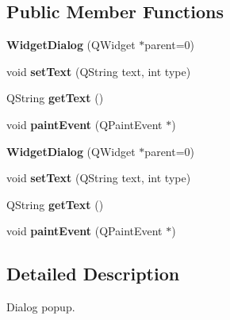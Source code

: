 \subsection*{Public Member Functions}
\begin{DoxyCompactItemize}
\item 
\hypertarget{class_widget_dialog_aa282c5193c1318f92bd21fe77a3f66bb}{}{\bfseries Widget\+Dialog} (Q\+Widget $\ast$parent=0)\label{class_widget_dialog_aa282c5193c1318f92bd21fe77a3f66bb}

\item 
\hypertarget{class_widget_dialog_ad4ee3d228612e11780f73839db9150a9}{}void {\bfseries set\+Text} (Q\+String text, int type)\label{class_widget_dialog_ad4ee3d228612e11780f73839db9150a9}

\item 
\hypertarget{class_widget_dialog_ab904d7133d4de10e637cc48aac3a3ecc}{}Q\+String {\bfseries get\+Text} ()\label{class_widget_dialog_ab904d7133d4de10e637cc48aac3a3ecc}

\item 
\hypertarget{class_widget_dialog_aa3af6ec9a3e6dc42e82f86a851994614}{}void {\bfseries paint\+Event} (Q\+Paint\+Event $\ast$)\label{class_widget_dialog_aa3af6ec9a3e6dc42e82f86a851994614}

\item 
\hypertarget{class_widget_dialog_aa282c5193c1318f92bd21fe77a3f66bb}{}{\bfseries Widget\+Dialog} (Q\+Widget $\ast$parent=0)\label{class_widget_dialog_aa282c5193c1318f92bd21fe77a3f66bb}

\item 
\hypertarget{class_widget_dialog_ad4ee3d228612e11780f73839db9150a9}{}void {\bfseries set\+Text} (Q\+String text, int type)\label{class_widget_dialog_ad4ee3d228612e11780f73839db9150a9}

\item 
\hypertarget{class_widget_dialog_ab904d7133d4de10e637cc48aac3a3ecc}{}Q\+String {\bfseries get\+Text} ()\label{class_widget_dialog_ab904d7133d4de10e637cc48aac3a3ecc}

\item 
\hypertarget{class_widget_dialog_aa3af6ec9a3e6dc42e82f86a851994614}{}void {\bfseries paint\+Event} (Q\+Paint\+Event $\ast$)\label{class_widget_dialog_aa3af6ec9a3e6dc42e82f86a851994614}

\end{DoxyCompactItemize}


\subsection{Detailed Description}
Dialog popup. 

